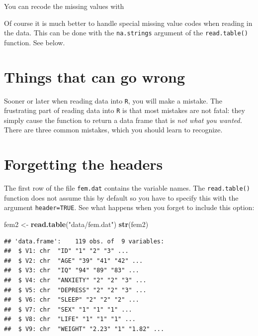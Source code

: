 \documentclass[
]{book}
\newenvironment{Shaded}{\begin{snugshade}}{\end{snugshade}}
\newcommand{\ConstantTok}[1]{\textcolor[rgb]{0.56,0.35,0.01}{#1}}
\newcommand{\DecValTok}[1]{\textcolor[rgb]{0.00,0.00,0.81}{#1}}
\newcommand{\FunctionTok}[1]{\textcolor[rgb]{0.13,0.29,0.53}{\textbf{#1}}}
\newcommand{\NormalTok}[1]{#1}
\newcommand{\OtherTok}[1]{\textcolor[rgb]{0.56,0.35,0.01}{#1}}
\newcommand{\SpecialCharTok}[1]{\textcolor[rgb]{0.81,0.36,0.00}{\textbf{#1}}}
\newcommand{\StringTok}[1]{\textcolor[rgb]{0.31,0.60,0.02}{#1}}
\theoremstyle{definition}
\theoremstyle{definition}
\theoremstyle{definition}
\theoremstyle{definition}
\theoremstyle{remark}
\begin{document}
You can recode the missing values with

\begin{Shaded}
\end{Shaded}

Of course it is much better to handle special missing value codes
when reading in the data. This can be done with the
\texttt{na.strings} argument of the \texttt{read.table()}
function. See below.

\section{Things that can go wrong}\label{things-that-can-go-wrong}

Sooner or later when reading data into \texttt{R}, you will make a
mistake. The frustrating part of reading data into \texttt{R} is that
most mistakes are not fatal: they simply cause the function to return
a data frame that is \emph{not what you wanted.} There are three
common mistakes, which you should learn to recognize.

\section{Forgetting the headers}\label{forgetting-the-headers}

The first row of the file \texttt{fem.dat} contains the variable names.
The \texttt{read.table()} function does not assume this by default so
you have to specify this with the argument \texttt{header=TRUE}. See
what happens when you forget to include this option:

\begin{Shaded}
\begin{Highlighting}[]
\NormalTok{fem2 }\OtherTok{\textless{}{-}} \FunctionTok{read.table}\NormalTok{(}\StringTok{"data/fem.dat"}\NormalTok{)}
\FunctionTok{str}\NormalTok{(fem2)}
\end{Highlighting}
\end{Shaded}

\begin{verbatim}
## 'data.frame':    119 obs. of  9 variables:
##  $ V1: chr  "ID" "1" "2" "3" ...
##  $ V2: chr  "AGE" "39" "41" "42" ...
##  $ V3: chr  "IQ" "94" "89" "83" ...
##  $ V4: chr  "ANXIETY" "2" "2" "3" ...
##  $ V5: chr  "DEPRESS" "2" "2" "3" ...
##  $ V6: chr  "SLEEP" "2" "2" "2" ...
##  $ V7: chr  "SEX" "1" "1" "1" ...
##  $ V8: chr  "LIFE" "1" "1" "1" ...
##  $ V9: chr  "WEIGHT" "2.23" "1" "1.82" ...
\end{verbatim}
\end{document}
